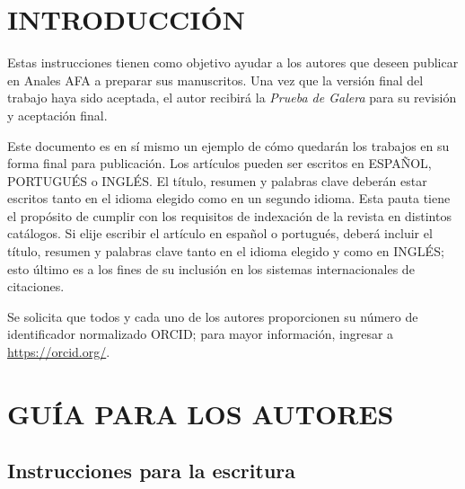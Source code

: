 \documentclass{analesafa}
\begin{document}

\thispagestyle{empty}     

\section{INTRODUCCIÓN}

Estas instrucciones tienen como objetivo ayudar a los autores que deseen publicar en Anales AFA a preparar sus manuscritos. Una vez que la versión final del trabajo haya sido aceptada, el autor recibirá la \textit{Prueba de Galera} para su revisión y aceptación final.

Este documento es en sí mismo un ejemplo de cómo quedarán los trabajos en su forma final para publicación. Los artículos pueden ser escritos en ESPAÑOL, PORTUGUÉS o INGLÉS. El título, resumen y palabras clave deberán estar escritos tanto en el idioma elegido como en un segundo idioma. Esta pauta tiene el propósito de cumplir con los requisitos de indexación de la revista en distintos catálogos.
Si elije escribir el artículo en español o portugués, deberá incluir el título, resumen y palabras clave tanto en el idioma elegido y como en INGLÉS; esto último es a los fines de su inclusión en los sistemas internacionales de citaciones. 

Se solicita que todos y cada uno de los autores proporcionen su número de identificador normalizado ORCID; para mayor información, ingresar a \url{https://orcid.org/}.


\section{GUÍA PARA LOS AUTORES}
\subsection{Instrucciones para la escritura}
\end{document}
